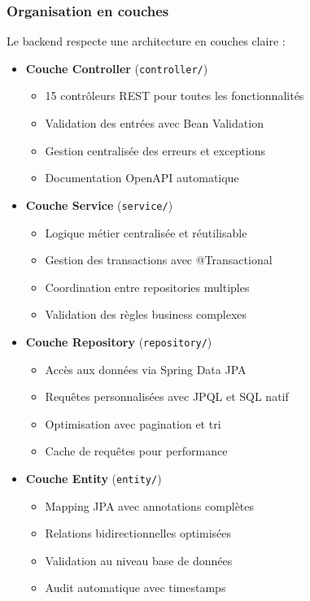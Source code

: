 \documentclass[12pt,a4paper]{report}
\begin{document}
\subsubsection{Organisation en couches}
Le backend respecte une architecture en couches claire :

\begin{itemize}
\item \textbf{Couche Controller} (\texttt{controller/})
  \begin{itemize}
  \item 15 contrôleurs REST pour toutes les fonctionnalités
  \item Validation des entrées avec Bean Validation
  \item Gestion centralisée des erreurs et exceptions
  \item Documentation OpenAPI automatique
  \end{itemize}

\item \textbf{Couche Service} (\texttt{service/})
  \begin{itemize}
  \item Logique métier centralisée et réutilisable
  \item Gestion des transactions avec @Transactional
  \item Coordination entre repositories multiples
  \item Validation des règles business complexes
  \end{itemize}

\item \textbf{Couche Repository} (\texttt{repository/})
  \begin{itemize}
  \item Accès aux données via Spring Data JPA
  \item Requêtes personnalisées avec JPQL et SQL natif
  \item Optimisation avec pagination et tri
  \item Cache de requêtes pour performance
  \end{itemize}

\item \textbf{Couche Entity} (\texttt{entity/})
  \begin{itemize}
  \item Mapping JPA avec annotations complètes
  \item Relations bidirectionnelles optimisées
  \item Validation au niveau base de données
  \item Audit automatique avec timestamps
  \end{itemize}
\end{itemize}
\end{document}
